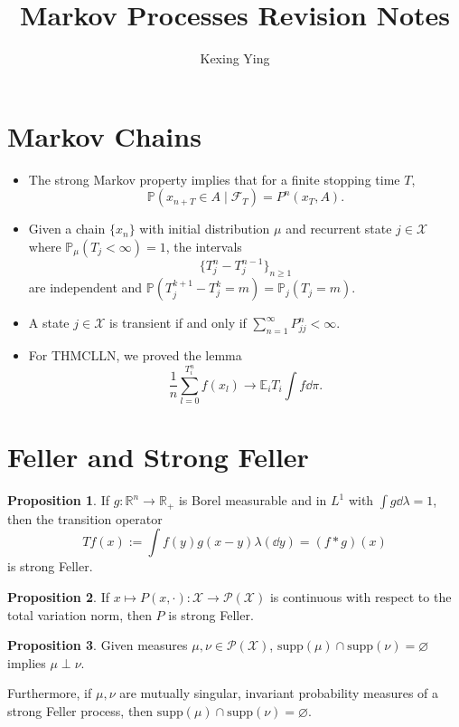 \documentclass[]{article}
\title{Markov Processes Revision Notes}
\author{Kexing Ying}
\theoremstyle{definition}
\newtheorem*{proposition}{Proposition}
\begin{document}
\maketitle

\section*{Markov Chains}

\begin{itemize}
  \item The strong Markov property implies that for a finite stopping time \(T\), 
  \[\mathbb{P}(x_{n + T} \in A \mid \mathcal{F}_T) = P^n(x_T, A).\]
  \item Given a chain \(\{x_n\}\) with initial distribution \(\mu\) and recurrent state 
  \(j \in \mathcal{X}\) where \(\mathbb{P}_\mu(T_j < \infty) = 1\), the intervals 
  \[\{T^n_j - T^{n - 1}_j\}_{n \ge 1}\]
  are independent and \(\mathbb{P}(T^{k + 1}_j - T^k_j = m) = \mathbb{P}_j(T_j = m)\).
  \item A state \(j \in \mathcal{X}\) is transient if and only if \(\sum_{n = 1}^\infty P^n_{jj} < \infty\).
  \item For THMCLLN, we proved the lemma 
  \[\frac{1}{n}\sum_{l = 0}^{T_i^n} f(x_l) \to \mathbb{E}_iT_i \int f \dd \pi.\] 
\end{itemize}

\section*{Feller and Strong Feller}

\begin{proposition}
  If \(g : \mathbb{R}^n \to \mathbb{R}_+\) is Borel measurable and in \(L^1\) with 
  \(\int g \dd \lambda = 1\), then the transition operator 
  \[Tf(x) := \int f(y) g(x- y) \lambda(\dd y) = (f * g)(x)\]
  is strong Feller.
\end{proposition}

\begin{proposition}
  If \(x \mapsto P(x, \cdot) : \mathcal{X} \to \mathcal{P}(\mathcal{X})\) is continuous 
  with respect to the total variation norm, then \(P\) is strong Feller.
\end{proposition}

\begin{proposition}
  Given measures \(\mu, \nu \in \mathcal{P}(\mathcal{X})\), 
  \(\text{supp}(\mu) \cap \text{supp}(\nu) = \varnothing\) implies \(\mu \perp \nu\).

  Furthermore, if \(\mu, \nu\) are mutually singular, invariant probability measures of a strong Feller 
  process, then \(\text{supp}(\mu) \cap \text{supp}(\nu) = \varnothing\).
\end{proposition}
\end{document}
